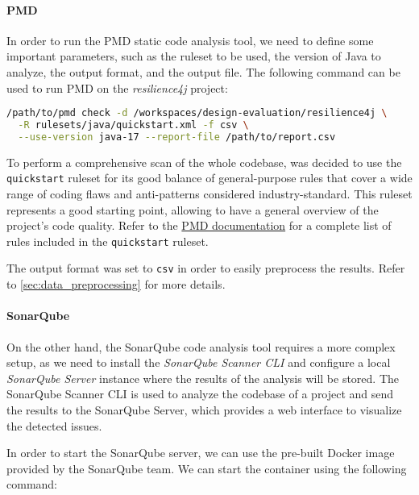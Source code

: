 \paragraph{PMD}
\label{sec:pmd_usage}

In order to run the PMD static code analysis tool, we need to define some important parameters, such as the ruleset to be used, the version of Java to analyze, the output format, and the output file. The following command can be used to run PMD on the \textit{resilience4j} project:

\begin{lstlisting}[language=bash, caption={Command to run PDM static code analysis}]
/path/to/pmd check -d /workspaces/design-evaluation/resilience4j \
  -R rulesets/java/quickstart.xml -f csv \
  --use-version java-17 --report-file /path/to/report.csv
\end{lstlisting}

\noindent To perform a comprehensive scan of the whole codebase, was decided to use the \texttt{quickstart} ruleset for its good balance of general-purpose rules that cover a wide range of coding flaws and anti-patterns considered industry-standard. This ruleset represents a good starting point, allowing to have a general overview of the project's code quality. Refer to the \href{https://pmd.github.io/pmd/pmd_rules_java.html#additional-rulesets}{PMD documentation} for a complete list of rules included in the \texttt{quickstart} ruleset.

The output format was set to \texttt{csv} in order to easily preprocess the results. Refer to \autoref{sec:data_preprocessing} for more details.

\paragraph{SonarQube}

On the other hand, the SonarQube code analysis tool requires a more complex setup, as we need to install the \textit{SonarQube Scanner CLI} and configure a local \textit{SonarQube Server} instance where the results of the analysis will be stored. The SonarQube Scanner CLI is used to analyze the codebase of a project and send the results to the SonarQube Server, which provides a web interface to visualize the detected issues.

In order to start the SonarQube server, we can use the pre-built Docker image provided by the SonarQube team. We can start the container using the following command:

